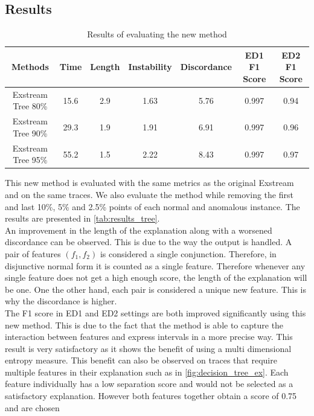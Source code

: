 \documentclass[oneside, a4paper, onecolumn, 11pt]{article}
\begin{document}
\subsection{Results}
\begin{table}[h]
  \centering
  \begin{tabular}{|c|c|c|c|c|c|c|}
      \hline
      Methods & Time & Length & Instability & Discordance & ED1 F1 Score & ED2 F1 Score\\ 
      \hline
      Exstream Tree 80\%  & 15.6 & 2.9  & 1.63 & 5.76 & 0.997 & 0.94 \\ 
      Exstream Tree 90\%  & 29.3  & 1.9  & 1.91 & 6.91 & 0.997 & 0.96 \\ 
      Exstream Tree 95\%  & 55.2  & 1.5  & 2.22 & 8.43 & 0.997 & 0.97 \\ 
      \hline
  \end{tabular}
  \caption{Results of evaluating the new method}
  \label{tab:results_tree}
\end{table}
This new method is evaluated with the same metrics as the original Exstream and on the same traces. We also evaluate the method while removing the first and last 10\%, 5\% and 2.5\% points of each normal and anomalous instance. The results are presented in \autoref{tab:results_tree}.\\
An improvement in the length of the explanation along with a worsened discordance can be observed. This is due to the way the output is handled. A pair of features $(f_1, f_2)$ is considered a single conjunction. Therefore, in disjunctive normal form it is counted as a single feature. Therefore whenever any single feature does not get a high enough score, the length of the explanation will be one. One the other hand, each pair is considered a unique new feature. This is why the discordance is higher.\\
The F1 score in ED1 and ED2 settings are both improved significantly using this new method. This is due to the fact that the method is able to capture the interaction between features and express intervals in a more precise way. This result is very satisfactory as it shows the benefit of using a multi dimensional entropy measure. This benefit can also be observed on traces that require multiple features in their explanation such as in \autoref{fig:decision_tree_ex}. Each feature individually has a low separation score and would not be selected as a satisfactory explanation. However both features together obtain a score of 0.75 and are chosen\\
\end{document}

